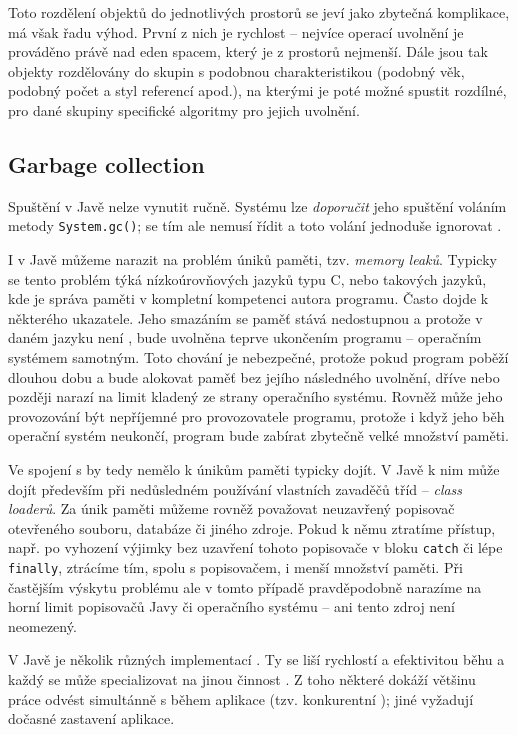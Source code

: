 Toto rozdělení objektů do jednotlivých prostorů se jeví jako zbytečná komplikace, má však řadu výhod. První z nich je rychlost – nejvíce operací uvolnění je prováděno právě nad eden spacem, který je z prostorů nejmenší. Dále jsou tak objekty rozdělovány do skupin s podobnou charakteristikou (podobný věk, podobný počet a styl referencí apod.), na kterými je poté možné spustit rozdílné, pro dané skupiny specifické algoritmy pro jejich uvolnění.

\subsection{Garbage collection}
	Spuštění  v Javě nelze vynutit ručně. Systému lze \textit{doporučit} jeho spuštění voláním metody \texttt{System.gc()};  se tím ale nemusí řídit a toto volání jednoduše ignorovat \cite{javagc}. 

I v Javě můžeme narazit na problém úniků paměti, tzv. \textit{memory leaků}. Typicky se tento problém týká nízkoúrovňových jazyků typu C, nebo takových jazyků, kde je správa paměti v kompletní kompetenci autora programu. Často dojde k  některého ukazatele. Jeho smazáním se paměť stává nedostupnou a protože v daném jazyku není , bude uvolněna teprve ukončením programu -- operačním systémem samotným. Toto chování je nebezpečné, protože pokud program poběží dlouhou dobu a bude alokovat paměť bez jejího následného uvolnění, dříve nebo později narazí na limit kladený ze strany operačního systému. Rovněž může jeho provozování být nepříjemné pro provozovatele programu, protože i když jeho běh operační systém neukončí, program bude zabírat zbytečně velké množství paměti.

Ve spojení s  by tedy nemělo k únikům paměti typicky dojít. V Javě k nim může dojít především při nedůsledném používání vlastních zavaděčů tříd -- \textit{class loaderů}. Za únik paměti můžeme rovněž považovat neuzavřený popisovač otevřeného souboru, databáze či jiného zdroje. Pokud k němu ztratíme přístup, např. po vyhození výjimky bez uzavření tohoto popisovače v bloku \texttt{catch} či lépe \texttt{finally}, ztrácíme tím, spolu s popisovačem, i menší množství paměti. Při častějším výskytu problému ale v tomto případě pravděpodobně narazíme na horní limit popisovačů Javy či operačního systému -- ani tento zdroj není neomezený.

V Javě je několik různých implementací . Ty se liší rychlostí a efektivitou běhu a každý se může specializovat na jinou činnost \cite{gc-details}. Z toho některé  dokáží většinu práce odvést simultánně s během aplikace (tzv. konkurentní ); jiné vyžadují dočasné zastavení aplikace.

